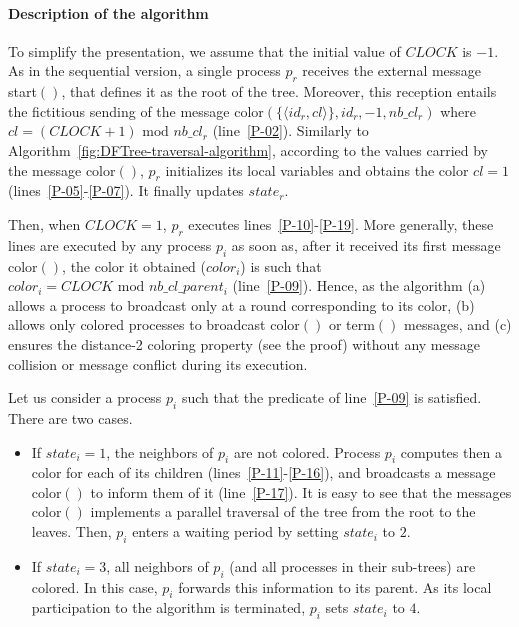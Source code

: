 \documentclass[11pt,english]{article}
\newcommand{\CLOCK}{\mathit{CLOCK}}
\begin{document}
\paragraph{Description of the algorithm}

To simplify the presentation, we assume that the initial value of
$\CLOCK$ is $-1$.  As in the sequential version, a single process $p_r$
receives the external message {\sc start}$()$, that defines it as the
root of the tree. Moreover, this reception entails the fictitious sending 
of the message {\sc color}$(\{\langle id_r,cl \rangle\}, id_r, -1, nb\_cl_r)$
where $cl= (\CLOCK+1) \mbox{ mod } nb\_cl_r$ (line~\ref{P-02}).
Similarly to Algorithm~\ref{fig:DFTree-traversal-algorithm}, 
according to the values carried by the message {\sc color}$()$, 
$p_r$ initializes its local variables and obtains the color $cl=1$
(lines~\ref{P-05}-\ref{P-07}).  It finally updates $state_r$.

Then, when $\CLOCK=1$, $p_r$ executes lines~\ref{P-10}-\ref{P-19}.
More generally, these lines are executed by any process $p_i$ as soon
as, after it received its first message {\sc color}$()$, the color it
obtained ($color_i$) is such that $color_i= \CLOCK \mbox{ mod }
nb\_cl\_parent_i$ (line~\ref{P-09}). Hence, as the algorithm (a)
allows a process to broadcast only at a round corresponding to its
color, (b) allows only colored processes to broadcast {\sc color}$()$
or {\sc term}$()$ messages, and (c) ensures the distance-2 coloring
property (see the proof) without any message collision or message
conflict during its execution.


Let us consider a process $p_i$ such that the predicate of line~\ref{P-09} 
is satisfied. There are two cases. 
\begin{itemize}
\vspace{-0.1cm}
\item If $state_i=1$, the neighbors of $p_i$ are not colored. 
Process $p_i$ computes then a color for each of its children 
(lines~\ref{P-11}-\ref{P-16}), and broadcasts a message {\sc color}$()$ 
to inform them of it (line~\ref{P-17}). It is easy to see that the messages 
{\sc color}$()$ implements a parallel traversal of the tree from the 
root to the leaves. Then,  $p_i$ enters a waiting period by 
setting $state_i$ to $2$. 
\vspace{-0.2cm}
\item If $state_i=3$, all neighbors of $p_i$ (and all processes in their 
sub-trees) are colored. In this case, $p_i$ forwards this information to 
its parent. As its local participation to the algorithm is terminated,  
$p_i$ sets $state_i$ to $4$. 
\end{itemize}
\end{document}
